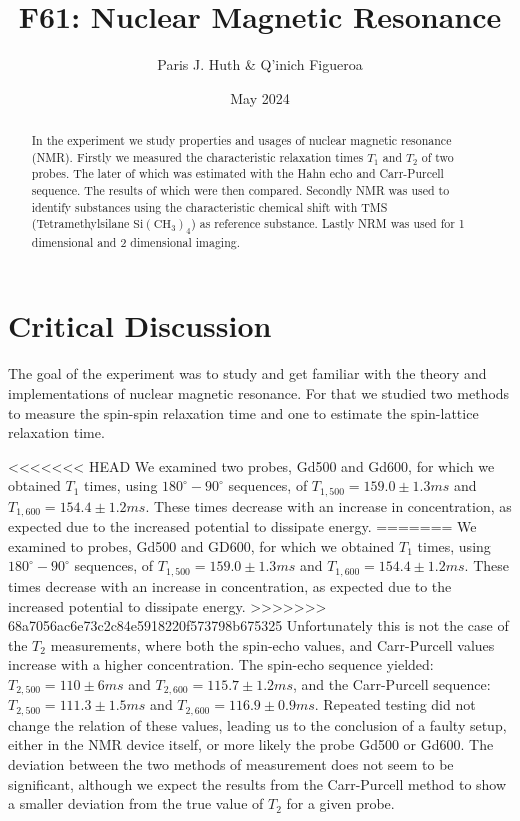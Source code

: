 \documentclass[11 pt]{article}
\title{F61: Nuclear Magnetic Resonance}
\author{Paris J. Huth \& Q'inich Figueroa}
\date{May 2024}
\begin{document}
\maketitle
\begin{center}
\begin{abstract}
In the experiment we study properties and usages of nuclear magnetic resonance (NMR). Firstly we measured the characteristic relaxation times $T_1$ and $T_2$ of two probes. The later of which was estimated with the Hahn echo and Carr-Purcell sequence. The results of which were then compared. Secondly NMR was used to identify substances using  the characteristic chemical shift with TMS (Tetramethylsilane $\mathrm{Si}\left(\mathrm{CH_3}\right)_4$) as reference substance. Lastly NRM was used for 1 dimensional and 2 dimensional imaging.  
\end{abstract}
\end{center}




\newpage
\section{Critical Discussion}
The goal of the experiment was to study and get familiar with the theory and implementations of nuclear magnetic resonance. For that we studied two methods to measure the spin-spin relaxation time and one to estimate the spin-lattice relaxation time.

<<<<<<< HEAD
We examined two probes, Gd500 and Gd600, for which we obtained $T_1$ times, using $180^\circ - 90^\circ$ sequences, of $T_{1,500}=159.0\pm 1.3 ms$ and $T_{1,600}=154.4\pm 1.2 ms$. These times decrease with an increase in concentration, as expected due to the increased potential to dissipate energy.
=======
We examined to probes, Gd500 and GD600, for which we obtained $T_1$ times, using $180^\circ - 90^\circ$ sequences, of $T_{1,500}=159.0\pm 1.3 ms$ and $T_{1,600}=154.4\pm 1.2 ms$. These times decrease with an increase in concentration, as expected due to the increased potential to dissipate energy.
>>>>>>> 68a7056ac6e73c2c84e5918220f573798b675325
Unfortunately this is not the case of the $T_2$ measurements, where both the spin-echo values, and Carr-Purcell values increase with a higher concentration. The spin-echo sequence yielded: $T_{2,500}=110\pm 6 ms$ and $T_{2,600}=115.7\pm 1.2 ms$, and the Carr-Purcell sequence: $T_{2,500}=111.3\pm 1.5 ms$ and $T_{2,600}=116.9\pm 0.9 ms$. Repeated testing did not change the relation of these values, leading us to the conclusion of a faulty setup, either in the NMR device itself, or more likely the probe Gd500 or Gd600. 
The deviation between the two methods of measurement does not seem to be significant, although we expect the results from the Carr-Purcell method to show a smaller deviation from the true value of $T_2$ for a given probe.
\end{document}
